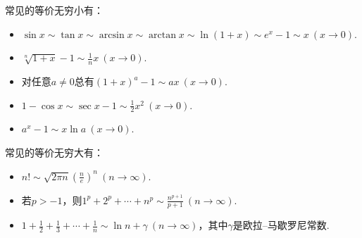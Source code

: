 常见的等价无穷小有：
\begin{itemize}
	\item \(\sin x%
		\sim \tan x%
		\sim \arcsin x%
		\sim \arctan x%
		\sim \ln(1+x)%
		\sim e^x-1%
		\sim x\ (x\to0)\).
	\item \(\sqrt[n]{1+x} - 1 \sim \frac1n x\ (x\to0)\).
	\item 对任意\(a\neq0\)总有\((1+x)^a-1 \sim ax\ (x\to0)\).%
	\item \(1-\cos x%
		\sim \sec x-1%
		\sim \frac12 x^2\ (x\to0)\).
	\item \(a^x-1 \sim x \ln a\ (x\to0)\).
\end{itemize}

常见的等价无穷大有：
\begin{itemize}
	\item \(n! \sim \sqrt{2 \pi n} \left( \frac{n}{e} \right)^n\ (n\to\infty)\).
	\item 若\(p>-1\)，则\(1^p+2^p+\dotsb+n^p \sim \frac{n^{p+1}}{p+1}\ (n\to\infty)\).%
	\item \(1+\frac12+\frac13+\dotsb+\frac1n \sim \ln n + \gamma\ (n\to\infty)\)，其中\(\gamma\)是欧拉--马歇罗尼常数.%
\end{itemize}

